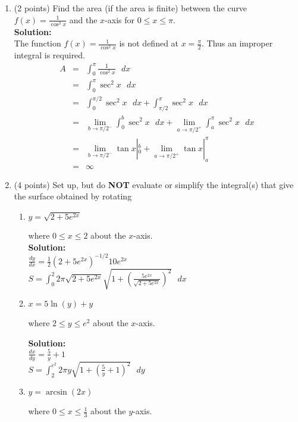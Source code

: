 \documentclass[paper=a4, fontsize=11pt]{scrartcl} %
\numberwithin{equation}{section} %
\numberwithin{figure}{section} %
\numberwithin{table}{section} %
\begin{document}
\begin{enumerate}
\item (2 points) Find the area (if the area is finite) between the curve $f(x)=\frac{1}{\cos^2 x}$ and the $x$-axis for $0 \le x \le \pi$.\\

\noindent\textbf{Solution:}\\
The function $f(x)=\frac{1}{\cos^2 x}$ is not defined at $x=\frac{\pi}{2}$. Thus an improper integral is required. \\

\begin{eqnarray*}
A&=& \int_0^\pi  \frac{1}{\cos^2 x} \text{ } dx \\
&=& \int_0^\pi  \sec^2 x \text{ } dx \\
&=& \int_0^{\pi/2}  \sec^2 x \text{ } dx + \int_{\pi/2}^\pi  \sec^2 x \text{ } dx \\
&=&\lim\limits_{b \rightarrow \pi/2^- } \int_0^{b}  \sec^2 x \text{ } dx + \lim\limits_{a \rightarrow \pi/2^+ } \int_{a}^\pi  \sec^2 x \text{ } dx\\
&=&\lim\limits_{b \rightarrow \pi/2^- } \tan x|_0^{b}  + \lim\limits_{a \rightarrow \pi/2^+ } \tan x|_{a}^\pi \\
&=& \infty
\end{eqnarray*}

\newpage


\item (4 points) Set up, but do \textbf{NOT} evaluate or simplify the integral(s) that give the surface obtained by rotating 
\begin{enumerate}
\item \begin{large}$y=\sqrt{2+5e^{2x}}$\end{large} where $0 \le x \le 2$ about the $x$-axis. \\

\noindent\textbf{Solution:}\\
$\frac{dy}{dx}=\frac{1}{2}(2+5e^{2x})^{-1/2}10e^{2x}$ \\
$S=\int_0^2 2 \pi \sqrt{2+5e^{2x}} \sqrt{1+\left(\frac{5e^{2x}}{\sqrt{2+5e^{2x}}}\right)^2}\text{  }dx$

\vspace{.5in}
\item \begin{large}$x=5 \ln(y) + y$\end{large} where $2 \le y \le e^2$ about the $x$-axis.


\noindent\textbf{Solution:}\\
$\frac{dx}{dy}=\frac{5}{y}+1$ \\
$S=\int_2^{e^2} 2 \pi y \sqrt{1+\left(\frac{5}{y}+1\right)^2}\text{  }dy$
\vspace{.5in}
\item \begin{large}$y=\arcsin(2x)$\end{large} where $0 \le x \le \frac{1}{3}$ about the $y$-axis.


\end{enumerate}
\end{enumerate}
\end{document}

